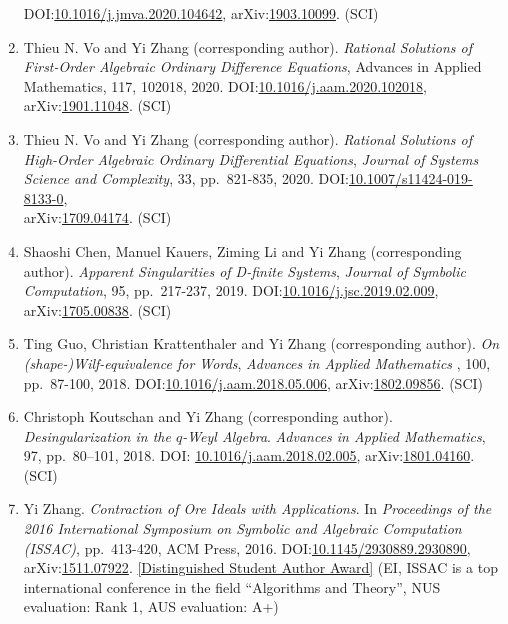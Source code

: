 \documentclass[a4paper,12pt]{article}
\begin{document}
\begin{enumerate}
 DOI:\href{https://doi.org/10.1016/j.jmva.2020.104642}{10.1016/j.jmva.2020.104642}, 
 arXiv:\href{http://arxiv.org/abs/1903.10099}{1903.10099}. (SCI)
 \item Thieu N. Vo and Yi Zhang (corresponding author). 
{\em Rational Solutions of First-Order Algebraic Ordinary Difference Equations},  Advances in Applied Mathematics, 117, 102018, 2020. 
DOI:\href{https://doi.org/10.1016/j.aam.2020.102018}{10.1016/j.aam.2020.102018},
arXiv:\href{http://arxiv.org/abs/1901.11048}{1901.11048}. (SCI)
 \item Thieu N. Vo and Yi Zhang (corresponding author). {\em Rational Solutions of High-Order Algebraic Ordinary Differential Equations},  {\em Journal of Systems Science and Complexity}, 33, pp.\ 821-835, 2020. DOI:\href{https://link.springer.com/article/10.1007/s11424-019-8133-0}{10.1007/s11424-019-8133-0}, \\
 arXiv:\href{https://arxiv.org/abs/1709.04174}{1709.04174}. (SCI)
  \item Shaoshi Chen, Manuel Kauers, Ziming Li and Yi Zhang (corresponding author). {\em Apparent Singularities of D-finite Systems}, 
 {\em  Journal of Symbolic Computation},  95, pp.\ 217-237, 2019. DOI:\href{https://doi.org/10.1016/j.jsc.2019.02.009}{10.1016/j.jsc.2019.02.009}, arXiv:\href{http://arxiv.org/abs/1705.00838}{1705.00838}. (SCI)
\item Ting Guo, Christian Krattenthaler and Yi Zhang (corresponding author).
{\em On (shape-)Wilf-equivalence for Words}, 
{\em  Advances in Applied Mathematics} , 100, pp.\ 87-100, 2018. 
DOI:\href{https://doi.org/10.1016/j.aam.2018.05.006}{10.1016/j.aam.2018.05.006}, 
arXiv:\href{https://arxiv.org/pdf/1802.09856.pdf}{1802.09856}. (SCI)
\item Christoph Koutschan and Yi Zhang (corresponding author). {\em Desingularization in the $q$-Weyl Algebra}. 
{\em Advances in Applied Mathematics}, 97, pp.\ 80–101, 2018. 
DOI: \href{http://dx.doi.org/10.1016/j.aam.2018.02.005}{10.1016/j.aam.2018.02.005},
arXiv:\href{https://arxiv.org/abs/1801.04160}{1801.04160}. (SCI) 
\item Yi Zhang. {\em Contraction of Ore Ideals with Applications}. 
In {\em Proceedings of the 2016 International Symposium on Symbolic and Algebraic Computation (ISSAC)}, 
pp.\ 413-420, ACM Press, 2016. DOI:\href{http://dl.acm.org/citation.cfm?id=2930890}{10.1145/2930889.2930890},
arXiv:\href{https://arxiv.org/abs/1511.07922}{1511.07922}. 
\href{https://www.sigsam.org/Awards/ISSACAwards.html}{[Distinguished Student Author Award]} 
(EI, ISSAC is a top international conference in the field ``Algorithms and Theory'', NUS evaluation: Rank 1, AUS evaluation: A+) 
\end{enumerate}
\end{document}
